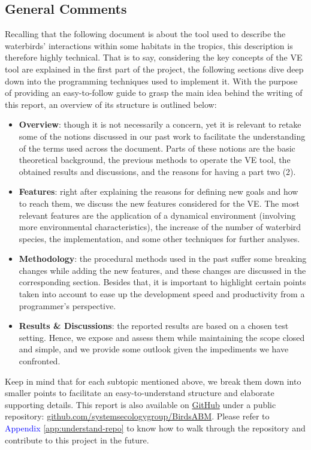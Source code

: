 \subsection{General Comments}
Recalling that the following document is about the tool used to describe the waterbirds' interactions within some habitats in the tropics, this description is therefore highly technical. That is to say, considering the key concepts of the VE tool are explained in the first part of the project, the following sections dive deep down into the programming techniques used to implement it. With the purpose of providing an easy-to-follow guide to grasp the main idea behind the writing of this report, an overview of its structure is outlined below:
\begin{itemize}
    \item \textbf{Overview}: though it is not necessarily a concern, yet it is relevant to retake some of the notions discussed in our past work to facilitate the understanding of the terms used across the document. Parts of these notions are the basic theoretical background, the previous methods to operate the VE tool, the obtained results and discussions, and the reasons for having a part two (2).
    \item \textbf{Features}: right after explaining the reasons for defining new goals and how to reach them, we discuss the new features considered for the VE. The most relevant features are the application of a dynamical environment (involving more environmental characteristics), the increase of the number of waterbird species, the  implementation, and some other techniques for further analyses.
    \item \textbf{Methodology}: the procedural methods used in the past suffer some breaking changes while adding the new features, and these changes are discussed in the corresponding section. Besides that, it is important to highlight certain points taken into account to ease up the development speed and productivity from a programmer's perspective.
    \item \textbf{Results \& Discussions}: the reported results are based on a chosen test setting. Hence, we expose and assess them while maintaining the scope closed and simple, and we provide some outlook given the impediments we have confronted.
\end{itemize}

Keep in mind that for each subtopic mentioned above, we break them down into smaller points to facilitate an easy-to-understand structure and elaborate supporting details. This report is also available on \href{https://github.com/}{GitHub} under a public repository: \href{https://github.com/systemsecologygroup/BirdsABM}{github.com/systemsecologygroup/BirdsABM}. Please refer to \textcolor{blue}{Appendix} \ref{app:understand-repo} to know how to walk through the repository and contribute to this project in the future.
